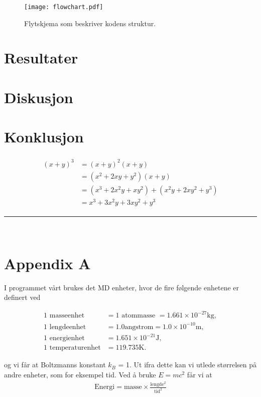 \documentclass[paper=a4, fontsize=11pt]{scrartcl} %
\numberwithin{equation}{section} %
\numberwithin{figure}{section} %
\numberwithin{table}{section} %
\newcommand{\horrule}[1]{\rule{\linewidth}{#1}} %
\begin{document}
\FloatBarrier
\begin{figure}[!ht]
 \centering
 \texttt{[image: flowchart.pdf]}
 \caption{Flytskjema som beskriver kodens struktur.}
 \label{flow}
 \end{figure}
 \FloatBarrier


\section{Resultater}

\section{Diskusjon}
\section{Konklusjon}


\begin{align} 
\begin{split}
(x+y)^3 	&= (x+y)^2(x+y)\\
&=(x^2+2xy+y^2)(x+y)\\
&=(x^3+2x^2y+xy^2) + (x^2y+2xy^2+y^3)\\
&=x^3+3x^2y+3xy^2+y^3
\end{split}					
\end{align}


\horrule{2pt} \\[0.5cm] %

\section{Appendix A}
I programmet vårt brukes det MD enheter, hvor de fire følgende enhetene er definert ved

\begin{align}
	\text{1 masseenhet } &= 1 \text{ atommasse } = 1.661\times 10^{-27}\mathrm{kg},\\
	\text{1 lengdeenhet } &= 1.0 \mathrm{angstrom} = 1.0\times 10^{-10}\mathrm{m},\\
	\text{1 energienhet } &= 1.651\times 10^{-21}\mathrm{J},\\
	\text{1 temperaturenhet} &= 119.735\mathrm{K}.
\end{align}

og vi får at Boltzmanns konstant $k_B$ = 1. Ut ifra dette kan vi utlede størrelsen på andre enheter, som for eksempel tid. Ved å bruke $E = mc^2$ får vi at
\begin{align}
\text{Energi} = \text{masse} \times \frac{\text{lengde}^2}{\text{tid}^2}
\end{align}
\end{document}
